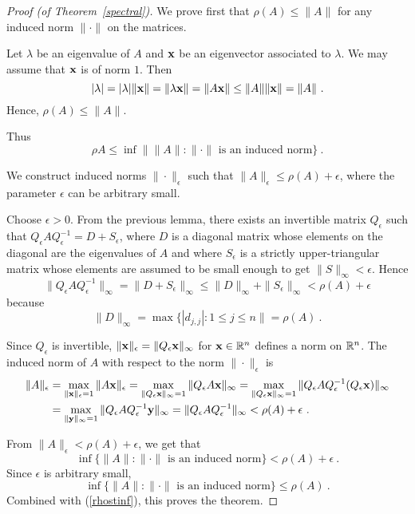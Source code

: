 \begin{proof}[Proof (of Theorem~\ref{spectral})]
 We prove first that $\rho (A) \leq \| A \|$ for any
induced norm $\|\cdot\|$ on the \nn matrices.

Let $\lambda$ be an eigenvalue of $A$ and $\mathbf{x}$ be an eigenvector
associated to $\lambda$.  We may assume that $\mathbf{x}$ is of norm
$1$.  Then
\[
|\lambda| = |\lambda| \|\VEC{x}\| = 
\|\lambda \VEC{x}\| = \| A\VEC{x} \| \leq \|A\| \|\VEC{x}\| = \|A\| \ .
\]
Hence, $\rho(A) \leq \|A\|$.

Thus
\begin{equation}\label{rhostinf}
\rho{A} \leq \inf \| \|A\| : \|\cdot\| \text{ is an induced norm} \} \ .
\end{equation}

 We construct induced norms $\|\cdot\|_\epsilon$
such that $\|A\|_\epsilon \leq \rho(A) + \epsilon$, where the parameter
$\epsilon$ can be arbitrary small.

Choose $\epsilon >0$.  From the previous lemma, there exists an
invertible matrix $Q_\epsilon$ such that
$Q_\epsilon A Q_\epsilon^{-1} = D + S_\epsilon$, where $D$ is a
diagonal matrix whose elements on the diagonal are the eigenvalues of
$A$ and where $S_\epsilon$ is a strictly upper-triangular matrix whose
elements are assumed to be small enough to get
$\|S\|_\infty < \epsilon$. 
Hence
\[
\|Q_\epsilon A Q_\epsilon^{-1}\|_\infty = \|D+S_\epsilon\|_\infty
\leq \|D\|_\infty + \|S_\epsilon\|_\infty
< \rho(A) + \epsilon
\]
because
\[
\|D\|_\infty = \max\{ |d_{j,j}| : 1 \leq j \leq n \| = \rho(A) \ .
\]

Since $Q_\epsilon$ is invertible,
$\|\mathbf{x}\|_\epsilon = \|Q_\epsilon\mathbf{x}\|_\infty$ for $\mathbf{x} \in \mathbb{R}^n$
defines a norm on $\mathbb{R}^n$.  The induced norm of $A$ with respect to
the norm $\|\cdot\|_\epsilon$ is
\begin{align*}
\|A\|_\epsilon &= \max_{\|\mathbf{x}\|_\epsilon=1} \|A\mathbf{x}\|_\epsilon
= \max_{\|Q_\epsilon \mathbf{x}\|_\infty=1} \|Q_\epsilon A\mathbf{x}\|_\infty
= \max_{\|Q_\epsilon \mathbf{x}\|_\infty=1}
\|Q_\epsilon A Q_\epsilon^{-1}(Q_\epsilon \mathbf{x})\|_\infty \\
&= \max_{\|\mathbf{y}\|_\infty=1} \|Q_\epsilon A Q_\epsilon^{-1}\mathbf{y}\|_\infty
= \|Q_\epsilon A Q_\epsilon^{-1}\|_\infty < \rho(A) + \epsilon \ .
\end{align*}

 From $\| A \|_\epsilon < \rho(A) + \epsilon$, we get that
\[
\inf \{ \|A\| : \|\cdot\| \text{ is an induced norm} \} < \rho(A) +
\epsilon \ .
\]
Since $\epsilon$ is arbitrary small, 
\[
\inf \{ \|A\| : \|\cdot\| \text{ is an induced norm} \} \leq \rho(A) \ .
\]
Combined with (\ref{rhostinf}), this proves the theorem.
\end{proof}

